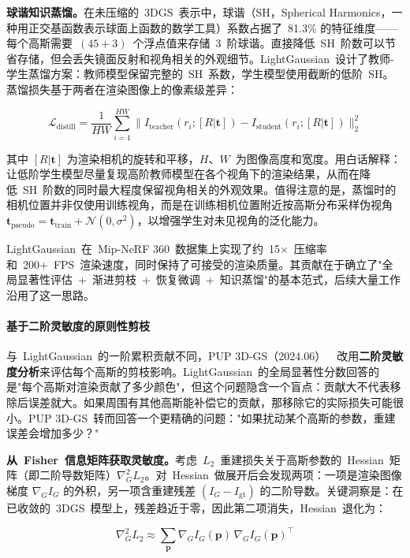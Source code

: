 \textbf{球谐知识蒸馏。}在未压缩的~3DGS~表示中，球谐（SH，Spherical Harmonics，一种用正交基函数表示球面上函数的数学工具）系数占据了~81.3\% 的特征维度——每个高斯需要~$(45+3)$~个浮点值来存储~3~阶球谐。直接降低~SH~阶数可以节省存储，但会丢失镜面反射和视角相关的外观细节。LightGaussian~设计了教师-学生蒸馏方案：教师模型保留完整的~SH~系数，学生模型使用截断的低阶~SH。蒸馏损失基于两者在渲染图像上的像素级差异：

\begin{equation}
\mathcal{L}_{\mathrm{distill}} = \frac{1}{HW} \sum_{i=1}^{HW} \| I_{\mathrm{teacher}}(r_i; [R|\mathbf{t}]) - I_{\mathrm{student}}(r_i; [R|\mathbf{t}]) \|_2^2
\end{equation}

其中 $[R|\mathbf{t}]$ 为渲染相机的旋转和平移，$H$、$W$~为图像高度和宽度。用白话解释：让低阶学生模型尽量复现高阶教师模型在各个视角下的渲染结果，从而在降低~SH~阶数的同时最大程度保留视角相关的外观效果。值得注意的是，蒸馏时的相机位置并非仅使用训练视角，而是在训练相机位置附近按高斯分布采样伪视角~$\mathbf{t}_{\mathrm{pseudo}} = \mathbf{t}_{\mathrm{train}} + \mathcal{N}(0, \sigma^2)$，以增强学生对未见视角的泛化能力。

LightGaussian~在~Mip-NeRF 360~数据集上实现了约~15$\times$~压缩率和~200+~FPS~渲染速度，同时保持了可接受的渲染质量。其贡献在于确立了"全局显著性评估~+~渐进剪枝~+~恢复微调~+~知识蒸馏"的基本范式，后续大量工作沿用了这一思路。

\paragraph{基于二阶灵敏度的原则性剪枝}

与~LightGaussian~的一阶累积贡献不同，PUP 3D-GS（2024.06）~\cite{2406_10219}~改用\textbf{二阶灵敏度分析}来评估每个高斯的剪枝影响。LightGaussian~的全局显著性分数回答的是"每个高斯对渲染贡献了多少颜色"，但这个问题隐含一个盲点：贡献大不代表移除后误差就大。如果周围有其他高斯能补偿它的贡献，那移除它的实际损失可能很小。PUP 3D-GS~转而回答一个更精确的问题："如果扰动某个高斯的参数，重建误差会增加多少？"

\textbf{从~Fisher~信息矩阵获取灵敏度。}考虑~$L_2$~重建损失关于高斯参数的~Hessian~矩阵（即二阶导数矩阵）$\nabla_G^2 L_2$。对~Hessian~做展开后会发现两项：一项是渲染图像梯度 $\nabla_G I_G$ 的外积，另一项含重建残差 $(I_G - I_{\mathrm{gt}})$ 的二阶导数。关键洞察是：在已收敛的~3DGS~模型上，残差趋近于零，因此第二项消失，Hessian~退化为：

\begin{equation}
\nabla_G^2 L_2 \approx \sum_{\mathbf{p}} \nabla_G I_G(\mathbf{p})\, \nabla_G I_G(\mathbf{p})^\top
\end{equation}

